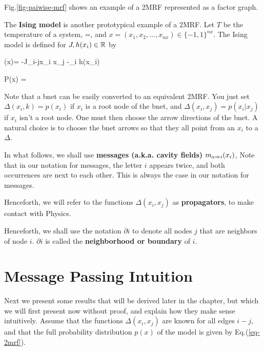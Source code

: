Fig.\ref{fig-paiwise-mrf}
shows an example
of a 2MRF
represented as a
factor graph.

The {\bf Ising model} is
another prototypical
example of a 2MRF. 
Let $T$ be the temperature
of a system, 
\beq
\theta=\;,
\eeq
and 
$x= (x_1, x_2, \ldots, x_{nx})
\in\{-1, 1\}^{nx}$.
The Ising model
is defined 
for $J,h(x_i)\in { \mathbb{R}}$ by

\beq
\eps(x)= -J\sum_{i-j}x_i x_j -\sum_i h(x_i)
\eeq

\beq
P(x) =
\eeq


Note that a bnet can
be easily converted to an
equivalent
2MRF.
You just
set $\Delta(x_i, k)=p(x_i)$
if $x_i$ is a root node
of the bnet,
and $\Delta(x_i, x_j)=p(x_i|x_j) $
if $x_i$ isn't a root node.
One 
must then choose
the arrow directions
of the bnet.
A natural choice
is to choose the
bnet arrows so 
that they all point from
an $x_i$ to a $\Delta$.



In what follows,
we shall use
{\bf messages (a.k.a. cavity fields)}
 $m_{a\Rightarrow i}(x_i)$,
Note
that in our
notation
for messages, the letter $i$
appears twice,
and both occurrences
are next to each other.
This is always the case in
our notation for messages.

Henceforth, we will
refer to the functions
$\Delta(x_i, x_j)$
as {\bf propagators},
to make contact with 
Physics.

Henceforth,
we shall use the notation
$\partial i$  
to denote all nodes
$j$ that
are neighbors of node $i$.
$\partial i$ is called
the {\bf neighborhood or boundary} of $i$.


\section{Message Passing Intuition}
Next we present
some results that will
be derived later in the chapter,
but which we will first
present  now without proof,
and explain how they
make sense intuitively.
Assume that the functions $\Delta(x_i, x_j)$ 
are known
for all edges $i-j$, and that
the full
probability distribution $p(x)$
of the model
is given by
Eq.(\ref{eq-2mrf}).

